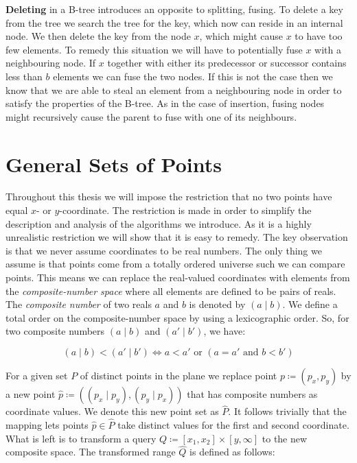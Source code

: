 \documentclass[twoside,11pt,openright]{report}
\begin{document}
\textbf{Deleting} in a B-tree introduces an opposite to splitting, fusing. To delete a key from the tree we search the tree for the key, which now can reside in an internal node. We then delete the key from the node $x$, which might cause $x$ to have too few elements. To remedy this situation we will have to potentially fuse $x$ with a neighbouring node. If $x$ together with either its predecessor or successor contains less than $b$ elements we can fuse the two nodes. If this is not the case then we know that we are able to steal an element from a neighbouring node in order to satisfy the properties of the B-tree. As in the case of insertion, fusing nodes might recursively cause the parent to fuse with one of its neighbours.

\section{General Sets of Points}
Throughout this thesis we will impose the restriction that no two points have equal $x$- or $y$-coordinate. The restriction is made in order to simplify the description and analysis of the algorithms we introduce. As it is a highly unrealistic restriction we will show that it is easy to remedy. The key observation is that we never assume coordinates to be real numbers. The only thing we assume is that points come from a totally ordered universe such we can compare points. This means we can replace the real-valued coordinates with elements from the \textit{composite-number space} where all elements are defined to be pairs of reals. The \textit{composite number} of two reals $a$ and $b$ is denoted by $(a \mid b)$. We define a total order on the composite-number space by using a lexicographic order. So, for two composite numbers $(a \mid b)$ and $(a' \mid b')$, we have:

$$ (a \mid b) < (a' \mid b') \Leftrightarrow a < a' \text{ or } (a = a' \text{ and } b < b') $$

For a given set $P$ of distinct points in the plane we replace point $p \coloneqq (p_x, p_y)$ by a new point $\hat{p} \coloneqq ((p_x \mid p_y),(p_y \mid p_x))$ that has composite numbers as coordinate values. We denote this new point set as $\hat{P}$. It follows trivially that the mapping lets points $\hat{p} \in \hat{P}$ take distinct values for the first and second coordinate. What is left is to transform a query $Q \coloneqq [x_1,x_2] \times [y,\infty]$ to the new composite space. The transformed range $\hat{Q}$ is defined as follows:
\end{document}
